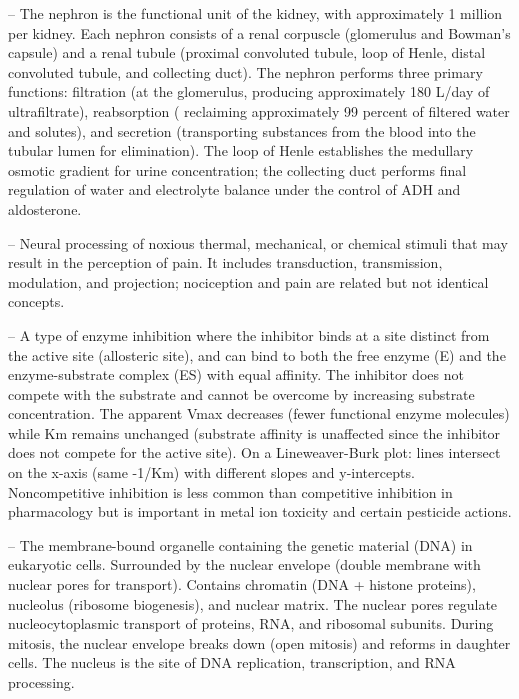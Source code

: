 -- The nephron is the functional unit of the kidney, with approximately 1 million per kidney. Each nephron consists of a renal corpuscle (glomerulus and Bowman's capsule) and a renal tubule (proximal convoluted tubule, loop of Henle, distal convoluted tubule, and collecting duct). The nephron performs three primary functions: filtration (at the glomerulus, producing approximately 180 L/day of ultrafiltrate), reabsorption ( reclaiming approximately 99 percent of filtered water and solutes), and secretion (transporting substances from the blood into the tubular lumen for elimination). The loop of Henle establishes the medullary osmotic gradient for urine concentration; the collecting duct performs final regulation of water and electrolyte balance under the control of ADH and aldosterone.

-- Neural processing of noxious thermal, mechanical, or chemical stimuli that may result in the perception of pain. It includes transduction, transmission, modulation, and projection; nociception and pain are related but not identical concepts.

-- A type of enzyme inhibition where the inhibitor binds at a site distinct from the active site (allosteric site), and can bind to both the free enzyme (E) and the enzyme-substrate complex (ES) with equal affinity. The inhibitor does not compete with the substrate and cannot be overcome by increasing substrate concentration. The apparent Vmax decreases (fewer functional enzyme molecules) while Km remains unchanged (substrate affinity is unaffected since the inhibitor does not compete for the active site). On a Lineweaver-Burk plot: lines intersect on the x-axis (same -1/Km) with different slopes and y-intercepts. Noncompetitive inhibition is less common than competitive inhibition in pharmacology but is important in metal ion toxicity and certain pesticide actions.

-- The membrane-bound organelle containing the genetic material (DNA) in eukaryotic cells. Surrounded by the nuclear envelope (double membrane with nuclear pores for transport). Contains chromatin (DNA + histone proteins), nucleolus (ribosome biogenesis), and nuclear matrix. The nuclear pores regulate nucleocytoplasmic transport of proteins, RNA, and ribosomal subunits. During mitosis, the nuclear envelope breaks down (open mitosis) and reforms in daughter cells. The nucleus is the site of DNA replication, transcription, and RNA processing.

